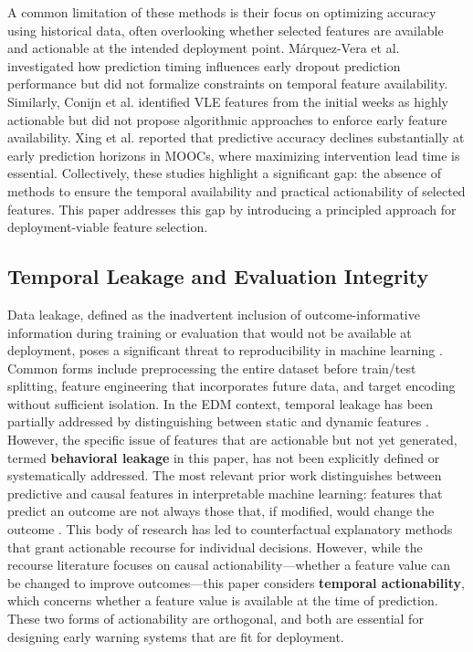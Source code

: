 \documentclass[a4paper,fleqn]{cas-sc}
\begin{document}
A common limitation of these methods is their focus on optimizing accuracy using historical data, often overlooking whether selected features are available and actionable at the intended deployment point. M\'{a}rquez-Vera et al. \cite{marquez2016} investigated how prediction timing influences early dropout prediction performance but did not formalize constraints on temporal feature availability. Similarly, Conijn et al. \cite{conijn2017} identified VLE features from the initial weeks as highly actionable but did not propose algorithmic approaches to enforce early feature availability. Xing et al. \cite{xing2016} reported that predictive accuracy declines substantially at early prediction horizons in MOOCs, where maximizing intervention lead time is essential. Collectively, these studies highlight a significant gap: the absence of methods to ensure the temporal availability and practical actionability of selected features. This paper addresses this gap by introducing a principled approach for deployment-viable feature selection.

\subsection{Temporal Leakage and Evaluation Integrity}
Data leakage, defined as the inadvertent inclusion of outcome-informative information during training or evaluation that would not be available at deployment, poses a significant threat to reproducibility in machine learning \cite{kaufman2012, kapoor2023}. Common forms include preprocessing the entire dataset before train/test splitting, feature engineering that incorporates future data, and target encoding without sufficient isolation. In the EDM context, temporal leakage has been partially addressed by distinguishing between static and dynamic features \cite{hlosta2017}. However, the specific issue of features that are actionable but not yet generated, termed \textbf{behavioral leakage} in this paper, has not been explicitly defined or systematically addressed. The most relevant prior work distinguishes between predictive and causal features in interpretable machine learning: features that predict an outcome are not always those that, if modified, would change the outcome \cite{ustun2019}. This body of research has led to counterfactual explanatory methods that grant actionable recourse for individual decisions. However, while the recourse literature focuses on causal actionability---whether a feature value can be changed to improve outcomes---this paper considers \textbf{temporal actionability}, which concerns whether a feature value is available at the time of prediction. These two forms of actionability are orthogonal, and both are essential for designing early warning systems that are fit for deployment.
\end{document}
